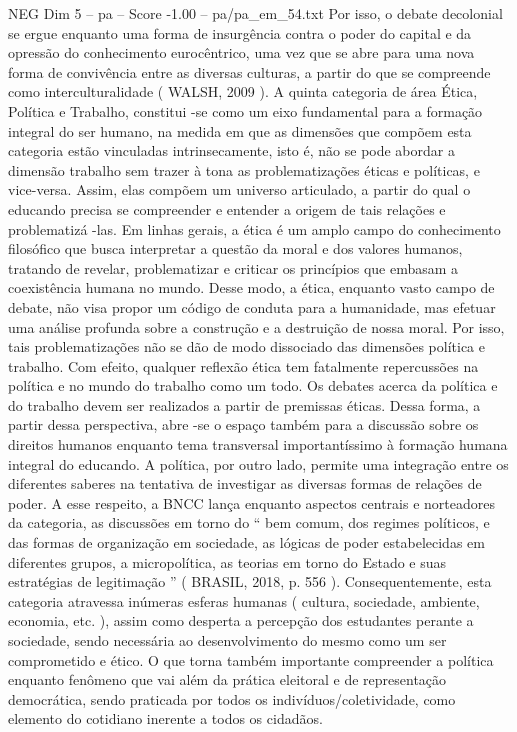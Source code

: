 \begin{textsample}{NEG Dim 5 – pa – Score -1.00 – pa/pa\_em\_54.txt}
Por isso, o debate decolonial se ergue enquanto uma forma de insurgência contra o poder do capital e da opressão do conhecimento eurocêntrico, uma vez que se abre para uma nova forma de convivência entre as diversas culturas, a partir do que se compreende como interculturalidade ( WALSH, 2009 ).
A quinta categoria de área Ética, Política e Trabalho, constitui -se como um eixo fundamental para a formação integral do ser humano, na medida em que as dimensões que compõem esta categoria estão vinculadas intrinsecamente, isto é, não se pode abordar a dimensão trabalho sem trazer à tona as problematizações éticas e políticas, e vice-versa.
Assim, elas compõem um universo articulado, a partir do qual o educando precisa se compreender e entender a origem de tais relações e problematizá -las.
Em linhas gerais, a ética é um amplo campo do conhecimento filosófico que busca interpretar a questão da moral e dos valores humanos, tratando de revelar, problematizar e criticar os princípios que embasam a coexistência humana no mundo.
Desse modo, a ética, enquanto vasto campo de debate, não visa propor um código de conduta para a humanidade, mas efetuar uma análise profunda sobre a construção e a destruição de nossa moral.
Por isso, tais problematizações não se dão de modo dissociado das dimensões política e trabalho.
Com efeito, qualquer reflexão ética tem fatalmente repercussões na política e no mundo do trabalho como um todo.
Os debates acerca da política e do trabalho devem ser realizados a partir de premissas éticas.
Dessa forma, a partir dessa perspectiva, abre -se o espaço também para a discussão sobre os direitos humanos enquanto tema transversal importantíssimo à formação humana integral do educando.
A política, por outro lado, permite uma integração entre os diferentes saberes na tentativa de investigar as diversas formas de relações de poder.
A esse respeito, a BNCC lança enquanto aspectos centrais e norteadores da categoria, as discussões em torno do “ bem comum, dos regimes políticos, e das formas de organização em sociedade, as lógicas de poder estabelecidas em diferentes grupos, a micropolítica, as teorias em torno do Estado e suas estratégias de legitimação ” ( BRASIL, 2018, p. 556 ).
Consequentemente, esta categoria atravessa inúmeras esferas humanas ( cultura, sociedade, ambiente, economia, etc. ), assim como desperta a percepção dos estudantes perante a sociedade, sendo necessária ao desenvolvimento do mesmo como um ser comprometido e ético.
O que torna também importante compreender a política enquanto fenômeno que vai além da prática eleitoral e de representação democrática, sendo praticada por todos os indivíduos/coletividade, como elemento do cotidiano inerente a todos os cidadãos.

\end{textsample}
